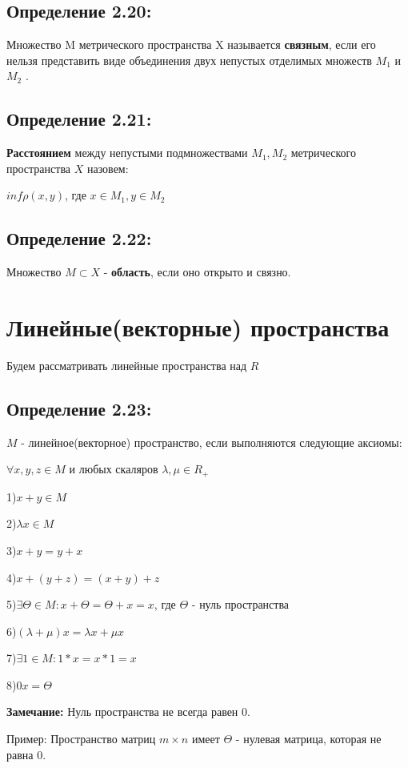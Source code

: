 \documentclass[12pt]{article}
\begin{document}
\subsection*{Определение 2.20:}	 		
	Множество M метрического пространства X называется \textbf{связным}, если его нельзя представить виде объединения двух непустых отделимых множеств $M_1$ и $M_2$ .
		
\subsection*{Определение 2.21:}
	\textbf{Расстоянием} между непустыми подмножествами $M_1, M_2$ метрического пространства $X$ назовем:
	
	$inf \rho(x,y)$, где $x \in M_1 , y \in M_2$
	
\subsection*{Определение 2.22:}
	Множество $M \subset X$ - \textbf{область}, если оно открыто и связно.

\newpage
\section{Линейные(векторные) пространства}
	Будем рассматривать линейные пространства над $R$
	
\subsection*{Определение 2.23:}
	$M$ - линейное(векторное) пространство, если выполняются следующие аксиомы:
	
	$\forall x,y,z \in M$  и любых скаляров $\lambda,\mu \in R_+$
	
	1)$ x + y \in M$
	
	2)$ \lambda x \in M$
	
	3)$x + y = y + x$
	
	4)$x + (y + z) = (x + y) + z$
	
	5)$\exists \Theta \in M : x + \Theta = \Theta + x = x$, где $\Theta$ - нуль пространства
	
	6)$(\lambda + \mu)x = \lambda x + \mu x$
	
	7)$\exists 1 \in M: 1*x = x * 1 = x$
	
	8)$0x = \Theta$

\textbf{Замечание:}
	Нуль пространства не всегда равен 0.
	
	Пример: Пространство матриц $m \times n$ имеет $\Theta$ - нулевая матрица, которая не равна 0.
	
\end{document}
